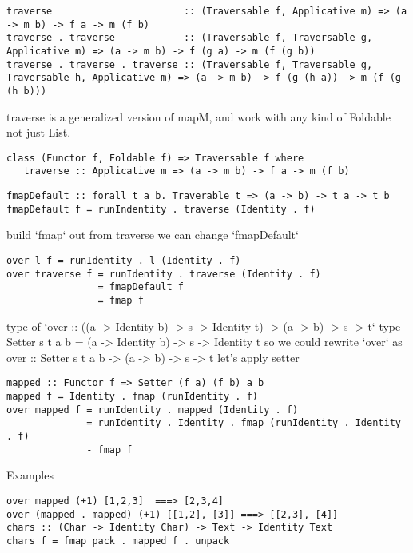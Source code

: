 \begin{verbatim}
traverse                       :: (Traversable f, Applicative m) => (a -> m b) -> f a -> m (f b)
traverse . traverse            :: (Traversable f, Traversable g, Applicative m) => (a -> m b) -> f (g a) -> m (f (g b))
traverse . traverse . traverse :: (Traversable f, Traversable g, Traversable h, Applicative m) => (a -> m b) -> f (g (h a)) -> m (f (g (h b)))
\end{verbatim}

traverse is a generalized version of mapM, and work with any kind of Foldable not just List.

\begin{verbatim}
class (Functor f, Foldable f) => Traversable f where
   traverse :: Applicative m => (a -> m b) -> f a -> m (f b)
\end{verbatim}

\begin{verbatim}
fmapDefault :: forall t a b. Traverable t => (a -> b) -> t a -> t b
fmapDefault f = runIndentity . traverse (Identity . f)
\end{verbatim}

build `fmap` out from traverse
we can change `fmapDefault`

\begin{verbatim}
over l f = runIdentity . l (Identity . f)
over traverse f = runIdentity . traverse (Identity . f)
                = fmapDefault f
                = fmap f
\end{verbatim}

type of `over :: ((a -> Identity b) -> s -> Identity t) -> (a -> b) -> s -> t`
type Setter s t a b = (a -> Identity b) -> s -> Identity t
so we could rewrite `over` as
over :: Setter s t a b -> (a -> b) -> s -> t
let’s apply setter

\begin{verbatim}
mapped :: Functor f => Setter (f a) (f b) a b
mapped f = Identity . fmap (runIdentity . f)
over mapped f = runIdentity . mapped (Identity . f)
              = runIdentity . Identity . fmap (runIdentity . Identity . f)
              - fmap f
\end{verbatim}

Examples

\begin{verbatim}
over mapped (+1) [1,2,3]  ===> [2,3,4]
over (mapped . mapped) (+1) [[1,2], [3]] ===> [[2,3], [4]]
chars :: (Char -> Identity Char) -> Text -> Identity Text
chars f = fmap pack . mapped f . unpack
\end{verbatim}

